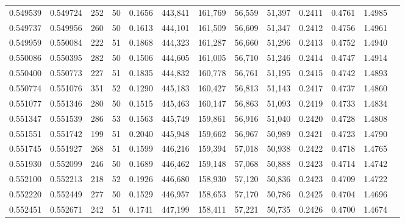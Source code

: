 \begin{tabular}{rrrrrrrrrrrrr}
0.549539 & 0.549724 &   252 &  50 &                                     0.1656 & 443,841 & 161,769 &  56,559 &  51,397 & 0.2411 & 0.4761 & 1.4985 \\
0.549737 & 0.549956 &   260 &  50 &                                     0.1613 & 444,101 & 161,509 &  56,609 &  51,347 & 0.2412 & 0.4756 & 1.4961 \\
0.549959 & 0.550084 &   222 &  51 &                                     0.1868 & 444,323 & 161,287 &  56,660 &  51,296 & 0.2413 & 0.4752 & 1.4940 \\
0.550086 & 0.550395 &   282 &  50 &                                     0.1506 & 444,605 & 161,005 &  56,710 &  51,246 & 0.2414 & 0.4747 & 1.4914 \\
0.550400 & 0.550773 &   227 &  51 &                                     0.1835 & 444,832 & 160,778 &  56,761 &  51,195 & 0.2415 & 0.4742 & 1.4893 \\
0.550774 & 0.551076 &   351 &  52 &                                     0.1290 & 445,183 & 160,427 &  56,813 &  51,143 & 0.2417 & 0.4737 & 1.4860 \\
0.551077 & 0.551346 &   280 &  50 &                                     0.1515 & 445,463 & 160,147 &  56,863 &  51,093 & 0.2419 & 0.4733 & 1.4834 \\
0.551347 & 0.551539 &   286 &  53 &                                     0.1563 & 445,749 & 159,861 &  56,916 &  51,040 & 0.2420 & 0.4728 & 1.4808 \\
0.551551 & 0.551742 &   199 &  51 &                                     0.2040 & 445,948 & 159,662 &  56,967 &  50,989 & 0.2421 & 0.4723 & 1.4790 \\
0.551745 & 0.551927 &   268 &  51 &                                     0.1599 & 446,216 & 159,394 &  57,018 &  50,938 & 0.2422 & 0.4718 & 1.4765 \\
0.551930 & 0.552099 &   246 &  50 &                                     0.1689 & 446,462 & 159,148 &  57,068 &  50,888 & 0.2423 & 0.4714 & 1.4742 \\
0.552100 & 0.552213 &   218 &  52 &                                     0.1926 & 446,680 & 158,930 &  57,120 &  50,836 & 0.2423 & 0.4709 & 1.4722 \\
0.552220 & 0.552449 &   277 &  50 &                                     0.1529 & 446,957 & 158,653 &  57,170 &  50,786 & 0.2425 & 0.4704 & 1.4696 \\
0.552451 & 0.552671 &   242 &  51 &                                     0.1741 & 447,199 & 158,411 &  57,221 &  50,735 & 0.2426 & 0.4700 & 1.4674 \\

\end{tabular}
